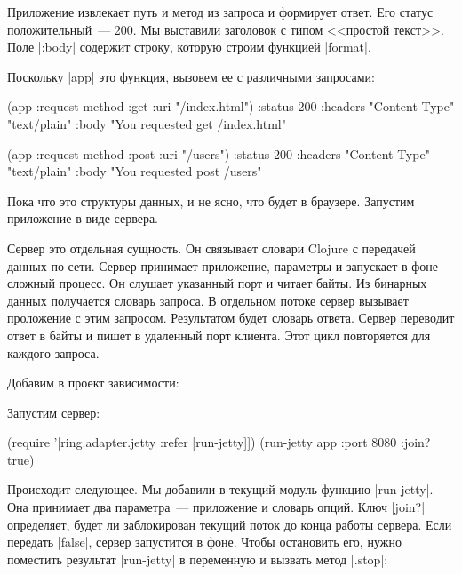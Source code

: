 Приложение извлекает путь и метод из запроса и формирует ответ. Его статус
положительный~--- 200. Мы выставили заголовок с типом <<простой текст>>. Поле
\spverb|:body| содержит строку, которую строим функцией \spverb|format|.

Поскольку \spverb|app| это функция, вызовем ее с различными запросами:

\begin{english}
  \begin{clojure}
(app {:request-method :get :uri "/index.html"})
{:status 200
 :headers {"Content-Type" "text/plain"}
 :body "You requested get /index.html"}

(app {:request-method :post :uri "/users"})
{:status 200
 :headers {"Content-Type" "text/plain"}
 :body "You requested post /users"}
  \end{clojure}
\end{english}

Пока что это структуры данных, и не ясно, что будет в браузере. Запустим
приложение в виде сервера.

Сервер это отдельная сущность. Он связывает словари Clojure с передачей данных
по сети. Сервер принимает приложение, параметры и запускает в фоне сложный
процесс. Он слушает указанный порт и читает байты. Из бинарных данных получается
словарь запроса. В отдельном потоке сервер вызывает проложение с этим
запросом. Результатом будет словарь ответа. Сервер переводит ответ в байты и
пишет в удаленный порт клиента. Этот цикл повторяется для каждого запроса.

Добавим в проект зависимости:

\begin{english}
  \begin{clojure}
  \end{clojure}
\end{english}

Запустим сервер:

\begin{english}
  \begin{clojure}
(require '[ring.adapter.jetty :refer [run-jetty]])
(run-jetty app {:port 8080 :join? true})
  \end{clojure}
\end{english}

Происходит следующее. Мы добавили в текущий модуль функцию
\spverb|run-jetty|. Она принимает два параметра~--- приложение и словарь
опций. Ключ \spverb|join?| определяет, будет ли заблокирован текущий поток до
конца работы сервера. Если передать \spverb|false|, сервер запустится в
фоне. Чтобы остановить его, нужно поместить результат \spverb|run-jetty| в
переменную и вызвать метод \spverb|.stop|:

